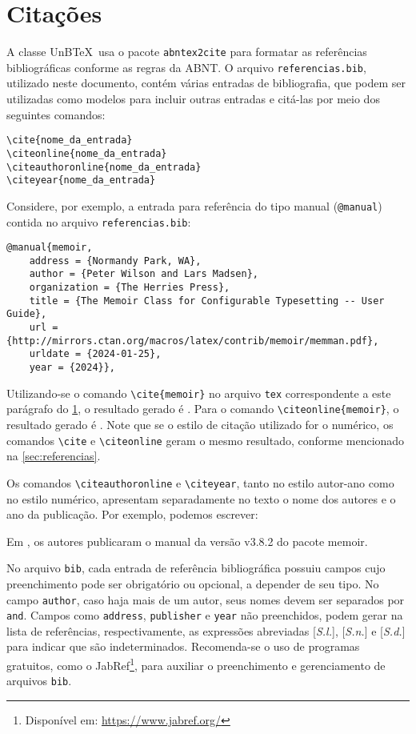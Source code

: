 \chapter{Citações}\label{apd:cit}

A classe UnB\TeX\ usa o pacote \texttt{abntex2cite} para formatar as referências bibliográficas conforme as regras da ABNT. O arquivo \texttt{referencias.bib}, utilizado neste documento, contém várias entradas de bibliografia, que podem ser utilizadas como modelos para incluir outras entradas e citá-las por meio dos seguintes comandos:
\begin{verbatim}
\cite{nome_da_entrada}
\citeonline{nome_da_entrada}
\citeauthoronline{nome_da_entrada}
\citeyear{nome_da_entrada}
\end{verbatim}

Considere, por exemplo, a entrada para referência do tipo manual (\texttt{@manual}) contida no arquivo \texttt{referencias.bib}:
\begin{verbatim}
@manual{memoir,
    address = {Normandy Park, WA},
    author = {Peter Wilson and Lars Madsen},
    organization = {The Herries Press},
    title = {The Memoir Class for Configurable Typesetting -- User Guide},
    url = {http://mirrors.ctan.org/macros/latex/contrib/memoir/memman.pdf},
    urldate = {2024-01-25},
    year = {2024}},
\end{verbatim}

Utilizando-se o comando \verb|\cite{memoir}| no arquivo \texttt{tex} correspondente a este parágrafo do \cref{apd:cit}, o resultado gerado é \cite{memoir}. Para o comando \verb|\citeonline{memoir}|, o resultado gerado é . Note que se o estilo de citação utilizado for o numérico, os comandos \verb|\cite| e \verb|\citeonline| geram o mesmo resultado, conforme mencionado na \cref{sec:referencias}.

Os comandos \verb|\citeauthoronline| e \verb|\citeyear|, tanto no estilo autor-ano como no estilo numérico, apresentam separadamente no texto o nome dos autores e o ano da publicação. Por exemplo, podemos escrever:

\begin{mdframed}[style=plainSty] %
Em \citeyear{memoir}, os autores  publicaram o manual da versão v3.8.2 do pacote \textsf{memoir}.
\end{mdframed}

No arquivo \texttt{bib}, cada entrada de referência bibliográfica possuiu campos cujo preenchimento pode ser obrigatório ou opcional, a depender de seu tipo. No campo \texttt{author}, caso haja mais de um autor, seus nomes devem ser separados por \texttt{and}. Campos como \texttt{address}, \texttt{publisher} e \texttt{year} não preenchidos, podem gerar na lista de referências, respectivamente, as expressões abreviadas [\emph{S.l.}], [\emph{S.n.}] e [\emph{S.d.}] para indicar que são indeterminados. Recomenda-se o uso de programas gratuitos, como o JabRef\footnote{Disponível em: \url{https://www.jabref.org/}}, para auxiliar o preenchimento e gerenciamento de arquivos \texttt{bib}.

